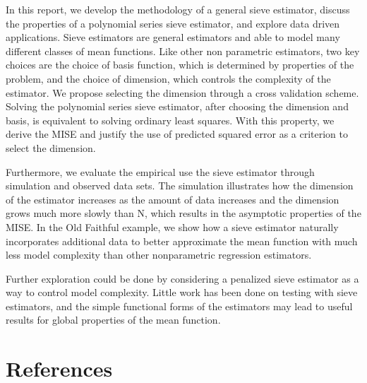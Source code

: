 \documentclass[12pt]{article}  %
\begin{document}
In this report, we develop the methodology of a general sieve estimator, discuss the properties of a polynomial series sieve estimator, and explore data driven applications. Sieve estimators are general estimators and able to model many different classes of mean functions. Like other non parametric estimators, two key  choices are the choice of basis function, which is determined by properties of the problem, and the choice of dimension, which controls the complexity of the estimator.  We propose selecting the dimension through a cross validation scheme. Solving the polynomial series sieve estimator, after choosing the dimension and basis, is equivalent to solving ordinary least squares. With this property, we derive the MISE and justify the use of predicted squared error as a criterion to select the dimension. 

Furthermore, we evaluate the empirical use the sieve estimator through simulation and observed data sets. The simulation illustrates how the dimension of the estimator increases as the amount of data increases and the dimension grows much more slowly than N, which results in the asymptotic properties of the  MISE.  In the Old Faithful example, we show how a sieve estimator naturally incorporates additional data to better approximate the mean function with much less model complexity than other nonparametric regression estimators. 

Further exploration could be done by considering a penalized sieve estimator as a way to control model complexity. Little work has been done on testing with sieve estimators, and the simple functional forms of the estimators may lead to useful results for global properties of the mean function. 


\section{References}
\nocite{*}
\printbibliography[heading=none]
\end{document}
